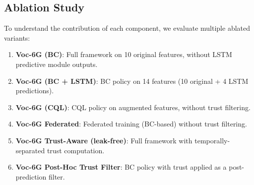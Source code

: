 \documentclass[10pt,letterpaper]{article}
\begin{document}
\subsection*{Ablation Study}
\label{sec:ablation}

To understand the contribution of each component, we evaluate multiple ablated variants:

\begin{enumerate}
    \item \textbf{Voc-6G (BC)}: Full framework on 10 original features, without LSTM predictive module outputs.
    \item \textbf{Voc-6G (BC + LSTM)}: BC policy on 14 features (10 original + 4 LSTM predictions).
    \item \textbf{Voc-6G (CQL)}: CQL policy on augmented features, without trust filtering.
    \item \textbf{Voc-6G Federated}: Federated training (BC-based) without trust filtering.
    \item \textbf{Voc-6G Trust-Aware (leak-free)}: Full framework with temporally-separated trust computation.
    \item \textbf{Voc-6G Post-Hoc Trust Filter}: BC policy with trust applied as a post-prediction filter.
\end{enumerate}
\end{document}
